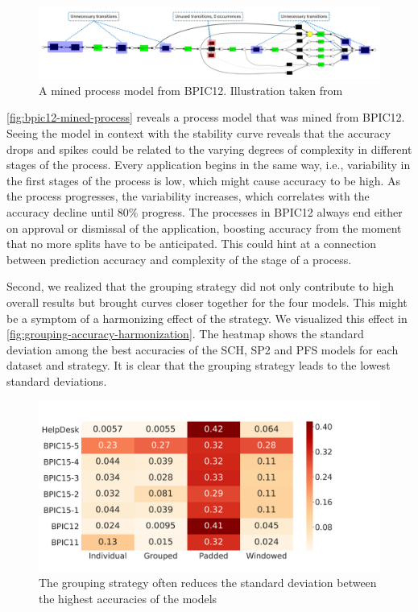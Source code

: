 \begin{figure}[!htb]
    \centering
    \begin{adjustbox}{center}
    \includegraphics[width=1.25\textwidth]{gfx/bpic12-mined-process.png}
    \end{adjustbox}
    \caption[A mined process model from BPIC12]{A mined process model from BPIC12. Illustration taken from~\cite{adriansyah2012mining}}
    \label{fig:bpic12-mined-process}
\end{figure}

\autoref{fig:bpic12-mined-process} reveals a process model that was mined from BPIC12.
Seeing the model in context with the stability curve reveals that the accuracy drops and spikes could be related to the varying degrees of complexity in different stages of the process.
Every application begins in the same way, i.e., variability in the first stages of the process is low, which might cause accuracy to be high.
As the process progresses, the variability increases, which correlates with the accuracy decline until $80\%$ progress.
The processes in BPIC12 always end either on approval or dismissal of the application, boosting accuracy from the moment that no more splits have to be anticipated.
This could hint at a connection between prediction accuracy and complexity of the stage of a process.

Second, we realized that the grouping strategy did not only contribute to high overall results but brought curves closer together for the four models.
This might be a symptom of a harmonizing effect of the strategy.
We visualized this effect in \autoref{fig:grouping-accuracy-harmonization}.
The heatmap shows the standard deviation among the best accuracies of the SCH, SP2 and PFS models for each dataset and strategy.
It is clear that the grouping strategy leads to the lowest standard deviations.

\begin{figure}[!htb]
    \centering
    \includegraphics[width=\textwidth]{gfx/grouping-accuracy-harmonization.pdf}
    \caption[Batching strategy harmonizes top accuracies]{The grouping strategy often reduces the standard deviation between the highest accuracies of the models}
    \label{fig:grouping-accuracy-harmonization}
\end{figure}

